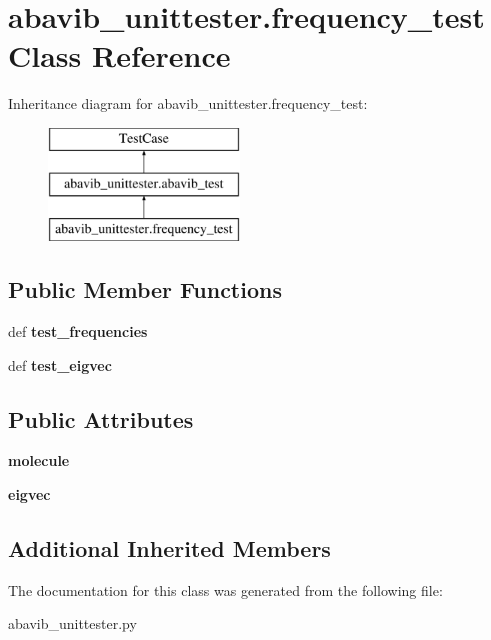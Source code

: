 \hypertarget{classabavib__unittester_1_1frequency__test}{\section{abavib\+\_\+unittester.\+frequency\+\_\+test Class Reference}
\label{classabavib__unittester_1_1frequency__test}
}
Inheritance diagram for abavib\+\_\+unittester.\+frequency\+\_\+test\+:\begin{figure}[H]
\begin{center}
\leavevmode
\includegraphics[height=3.000000cm]{classabavib__unittester_1_1frequency__test}
\end{center}
\end{figure}
\subsection*{Public Member Functions}
\begin{DoxyCompactItemize}
\item 
\hypertarget{classabavib__unittester_1_1frequency__test_a8fbdf092f714ef93e37372c969a69b11}{def {\bfseries test\+\_\+frequencies}}\label{classabavib__unittester_1_1frequency__test_a8fbdf092f714ef93e37372c969a69b11}

\item 
\hypertarget{classabavib__unittester_1_1frequency__test_aa92a00e3b45c51000469f5a1484ef31d}{def {\bfseries test\+\_\+eigvec}}\label{classabavib__unittester_1_1frequency__test_aa92a00e3b45c51000469f5a1484ef31d}

\end{DoxyCompactItemize}
\subsection*{Public Attributes}
\begin{DoxyCompactItemize}
\item 
\hypertarget{classabavib__unittester_1_1frequency__test_a4b964bb6cb824031746a950976d11502}{{\bfseries molecule}}\label{classabavib__unittester_1_1frequency__test_a4b964bb6cb824031746a950976d11502}

\item 
\hypertarget{classabavib__unittester_1_1frequency__test_ad908bea16d6dab17748c275cbe6a013b}{{\bfseries eigvec}}\label{classabavib__unittester_1_1frequency__test_ad908bea16d6dab17748c275cbe6a013b}

\end{DoxyCompactItemize}
\subsection*{Additional Inherited Members}


The documentation for this class was generated from the following file\+:\begin{DoxyCompactItemize}
\item 
abavib\+\_\+unittester.\+py\end{DoxyCompactItemize}
